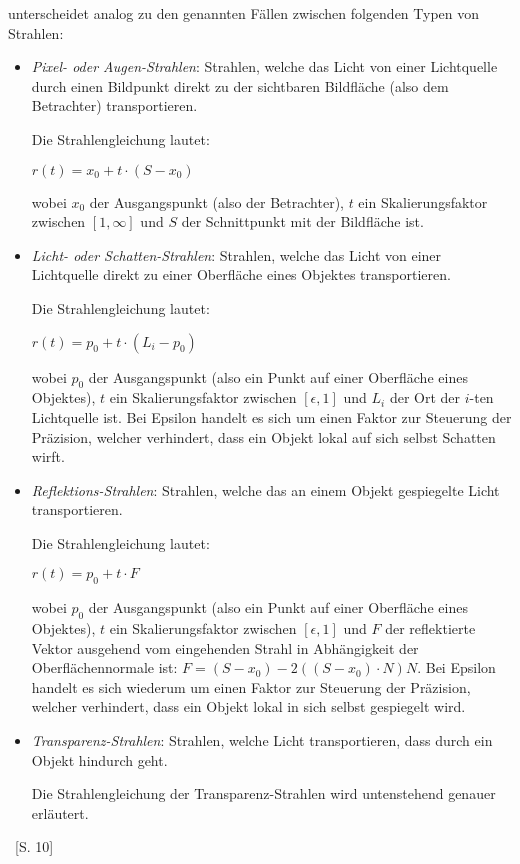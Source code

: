 \citeauthor{glassner_introduction_1989} unterscheidet analog zu den
genannten Fällen zwischen folgenden Typen von Strahlen:
\begin{itemize}
    \item{\textit{Pixel- oder Augen-Strahlen}:} Strahlen, welche das Licht von
        einer Lichtquelle durch einen Bildpunkt direkt zu der sichtbaren
        Bildfläche (also dem Betrachter) transportieren.

        Die Strahlengleichung lautet:

        $r(t) = x_{0} + t \cdot (S - x_{0})$

        wobei $x_{0}$ der Ausgangspunkt (also der Betrachter), $t$ ein
        Skalierungsfaktor zwischen $[1, \infty]$ und $S$ der Schnittpunkt mit der
        Bildfläche ist.

    \item{\textit{Licht- oder Schatten-Strahlen}:} Strahlen, welche das Licht von
        einer Lichtquelle direkt zu einer Oberfläche eines Objektes
        transportieren.

        Die Strahlengleichung lautet:

        $r(t) = p_{0} + t \cdot (L_{i} - p_{0})$

        wobei $p_{0}$ der Ausgangspunkt (also ein Punkt auf einer
        Oberfläche eines Objektes), $t$ ein Skalierungsfaktor zwischen
        $[\epsilon, 1]$ und $L_{i}$ der Ort der $i$-ten Lichtquelle ist.
        Bei Epsilon handelt es sich um einen Faktor zur Steuerung der
        Präzision, welcher verhindert, dass ein Objekt lokal auf sich
        selbst Schatten wirft.

    \item{\textit{Reflektions-Strahlen}:} Strahlen, welche das an einem
        Objekt gespiegelte Licht transportieren.

        Die Strahlengleichung lautet:

        $r(t) = p_{0} + t \cdot F$

        wobei $p_{0}$ der Ausgangspunkt (also ein Punkt auf einer
        Oberfläche eines Objektes), $t$ ein Skalierungsfaktor zwischen
        $[\epsilon, 1]$ und $F$ der reflektierte Vektor ausgehend vom
        eingehenden Strahl in Abhängigkeit der Oberflächennormale ist:
        $F = (S - x_{0}) - 2((S - x_{0}) \cdot N)N$.  Bei Epsilon
        handelt es sich wiederum um einen Faktor zur Steuerung der
        Präzision, welcher verhindert, dass ein Objekt lokal in sich
        selbst gespiegelt wird.

    \item{\textit{Transparenz-Strahlen}:} Strahlen, welche Licht
        transportieren, dass durch ein Objekt hindurch geht.

        Die Strahlengleichung der Transparenz-Strahlen wird untenstehend
        genauer erläutert.

\end{itemize}~\cite{glassner_introduction_1989}[S. 10]

